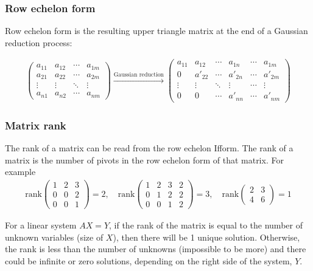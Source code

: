 \documentclass[usenames,dvipsnames,aspectratio=169,10pt]{beamer}
\numberwithin{equation}{section}
\begin{document}
\begin{frame}
\frametitle{Row echelon form}

Row echelon form is the resulting upper triangle matrix at the end of a Gaussian reduction process: 

\begin{align*}
\begin{pmatrix}
a_{11} & a_{12} & \cdots & a_{1m} \\
a_{21} & a_{22} & \cdots & a_{2m} \\
\vdots & \vdots & \ddots & \vdots \\
a_{n1} & a_{n2} & \cdots & a_{nm}
\end{pmatrix}
\xrightarrow{\text{Gaussian reduction}}
\begin{pmatrix}
a_{11} & a_{12}  & \cdots & a_{1n}  & \cdots & a_{1m}  \\
0      & a'_{22} & \cdots & a'_{2n} & \cdots & a'_{2m} \\
\vdots & \vdots  & \ddots & \vdots  & \cdots & \vdots  \\
0      & 0       & \cdots & a'_{nn} & \cdots & a'_{nm} 
\end{pmatrix}
\end{align*}


\end{frame}



\begin{frame}
\frametitle{Matrix rank}

The rank of a matrix can be read from the row echelon Ifform. The rank of a matrix is the number of pivots in the row echelon form of that matrix. For example
\begin{align*}
\text{rank}\begin{pmatrix}
1 & 2 & 3 \\
0 & 0 & 2 \\
0 & 0 & 1
\end{pmatrix}
=2,
\quad
\text{rank}\begin{pmatrix}
1 & 2 & 3 & 2\\
0 & 1 & 2 & 2 \\
0 & 0 & 1 & 2
\end{pmatrix}
=3,
\quad
\text{rank}\begin{pmatrix}
2 & 3 \\
4 & 6
\end{pmatrix}
=1
\end{align*}

For a linear system $AX=Y$, if the rank of the matrix is equal to the number of unknown variables (size of $X$), then there will be 1 unique solution. Otherwise, the rank is less than the number of unknowns (impossible to be more) and there could be infinite or zero solutions, depending on the right side of the system, $Y$.
\end{frame}
\end{document}
